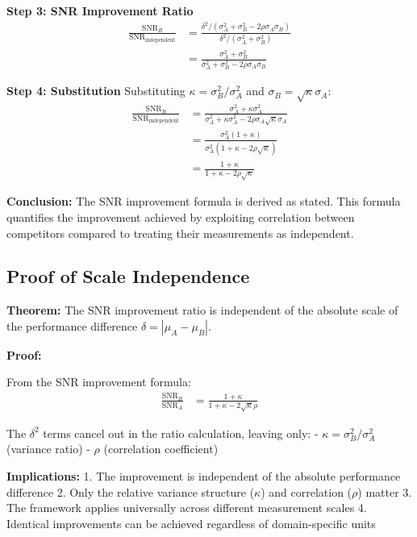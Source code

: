 \textbf{Step 3: SNR Improvement Ratio}
\begin{align}
\frac{\text{SNR}_R}{\text{SNR}_{\text{independent}}} &= \frac{\delta^2/(\sigma_A^2 + \sigma_B^2 - 2\rho\sigma_A\sigma_B)}{\delta^2/(\sigma_A^2 + \sigma_B^2)} \\
&= \frac{\sigma_A^2 + \sigma_B^2}{\sigma_A^2 + \sigma_B^2 - 2\rho\sigma_A\sigma_B}
\end{align}

\textbf{Step 4: Substitution}
Substituting $\kappa = \sigma_B^2/\sigma_A^2$ and $\sigma_B = \sqrt{\kappa}\sigma_A$:
\begin{align}
\frac{\text{SNR}_R}{\text{SNR}_{\text{independent}}} &= \frac{\sigma_A^2 + \kappa\sigma_A^2}{\sigma_A^2 + \kappa\sigma_A^2 - 2\rho\sigma_A\sqrt{\kappa}\sigma_A} \\
&= \frac{\sigma_A^2(1 + \kappa)}{\sigma_A^2(1 + \kappa - 2\rho\sqrt{\kappa})} \\
&= \frac{1 + \kappa}{1 + \kappa - 2\rho\sqrt{\kappa}}
\end{align}

\textbf{Conclusion:} The SNR improvement formula is derived as stated. This formula quantifies the improvement achieved by exploiting correlation between competitors compared to treating their measurements as independent.

\subsection{Proof of Scale Independence}

\textbf{Theorem:} The SNR improvement ratio is independent of the absolute scale of the performance difference $\delta = |\mu_A - \mu_B|$.

\textbf{Proof:}

From the SNR improvement formula:
\begin{align}
\frac{\text{SNR}_R}{\text{SNR}_A} &= \frac{1 + \kappa}{1 + \kappa - 2\sqrt{\kappa}\rho}
\end{align}

The $\delta^2$ terms cancel out in the ratio calculation, leaving only:
- $\kappa = \sigma_B^2/\sigma_A^2$ (variance ratio)
- $\rho$ (correlation coefficient)

\textbf{Implications:}
1. The improvement is independent of the absolute performance difference
2. Only the relative variance structure ($\kappa$) and correlation ($\rho$) matter
3. The framework applies universally across different measurement scales
4. Identical improvements can be achieved regardless of domain-specific units

